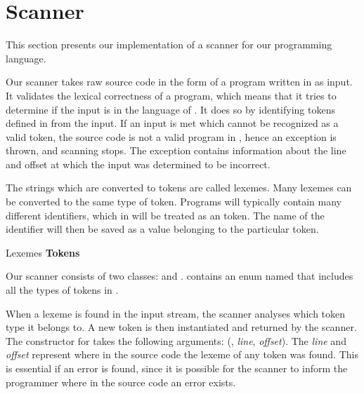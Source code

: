 \section{Scanner}
\label{sec:scannerimplementation}
This section presents our implementation of a scanner for our programming language.

Our scanner takes raw source code in the form of a program written in
\productname{} as input. It validates the lexical correctness of a
\productname{} program, which means that it tries to determine if the
input is in the language of \productname{}. It does so by identifying
tokens defined in \productname{} from the input. If an input is met
which cannot be recognized as a valid token, the source code is not
a valid program in \productname{}, hence an exception is thrown, and
scanning stops. The exception contains information about the line and
offset at which the input was determined to be incorrect.

The strings which are converted to tokens are called lexemes. Many
lexemes can be converted to the same type of token. Programs will
typically contain many different identifiers, which in \productname{}
will be treated as an  token. The name of the identifier will
then be saved as a value belonging to the particular token.

                 {		     }
       {Lexemes	}{\textbf{Tokens}    }{
\tabrow{$[$    	}{ LBRACKET	     }
\tabrow{$]$	}{ RBRACKET 	     }
}

Our scanner consists of two classes:  and
.  contains an enum named
 that includes all the types of tokens in \productname{}.

When a lexeme is found in the input stream, the scanner analyses which
token type it belongs to. A new token is then instantiated and returned
by the scanner. The constructor for  takes the following
arguments: (, \textit{line}, \textit{offset}). The
\textit{line} and \textit{offset} represent where in the source code the
lexeme of any token was found. This is essential if an error is found,
since it is possible for the scanner to inform the programmer where in
the source code an error exists.

